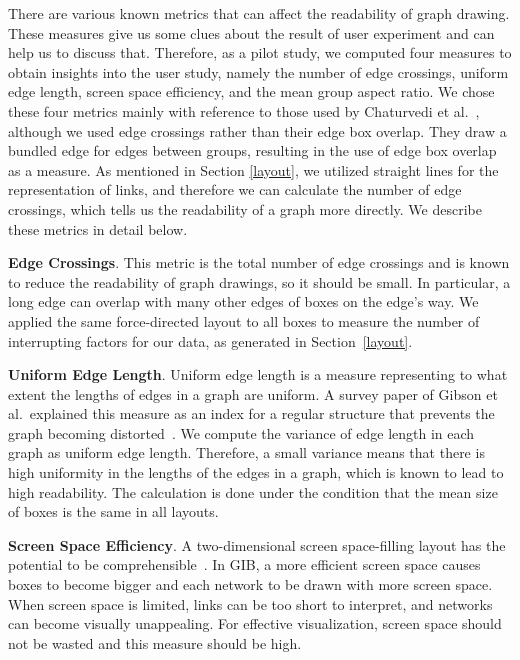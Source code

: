 \documentclass[review]{vgtc}                 %
\begin{document}
There are various known metrics that can affect the readability of graph drawing.
These measures give us some clues about the result of user experiment and can help us to discuss that.
Therefore, as a pilot study, we computed four measures to obtain insights into the user study, namely the number of edge crossings, uniform edge length, screen space efficiency, and the mean group aspect ratio.
We chose these four metrics mainly with reference to those used by Chaturvedi et al.~\cite{chaturvedi2014group}, although we used edge crossings rather than their edge box overlap.
They draw a bundled edge for edges between groups, resulting in the use of edge box overlap as a measure.
As mentioned in Section \ref{layout}, we utilized straight lines for the representation of links, and therefore we can calculate the number of edge crossings, which tells us the readability of a graph more directly.
We describe these metrics in detail below.

{\bf Edge Crossings}.
This metric is the total number of edge crossings and is known to reduce the readability of graph drawings, so it should be small.
In particular, a long edge can overlap with many other edges of boxes on the edge's way.
We applied the same force-directed layout to all boxes to measure the number of interrupting factors for our data, as generated in Section~\ref{layout}.

{\bf Uniform Edge Length}.
Uniform edge length is a measure representing to what extent the lengths of edges in a graph are uniform.
A survey paper of Gibson et al.\ explained this measure as an index for a regular structure that prevents the graph becoming distorted~\cite{doi:10.1177/1473871612455749}.
We compute the variance of edge length in each graph as uniform edge length.
Therefore, a small variance means that there is high uniformity in the lengths of the edges in a graph, which is known to lead to high readability.
The calculation is done under the condition that the mean size of boxes is the same in all layouts.

{\bf Screen Space Efficiency}.
A two-dimensional screen space-filling layout has the potential to be comprehensible~\cite{shneiderman1992tree}.
In GIB, a more efficient screen space causes boxes to become bigger and each network to be drawn with more screen space.
When screen space is limited, links can be too short to interpret, and networks can become visually unappealing.
For effective visualization, screen space should not be wasted and this measure should be high.
\end{document}
